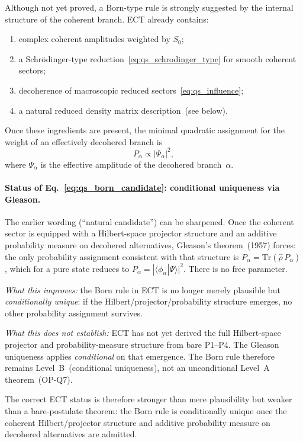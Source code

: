 \documentclass[11pt,a4paper]{article}
\numberwithin{equation}{section}
\begin{document}
Although not yet proved, a Born-type rule is strongly suggested by the
internal structure of the coherent branch.
ECT already contains:
\begin{enumerate}[label=(\roman*)]
  \item complex coherent amplitudes weighted by $S_0$;
  \item a Schr\"odinger-type reduction~\eqref{eq:qs_schrodinger_type}
    for smooth coherent sectors;
  \item decoherence of macroscopic reduced sectors~\eqref{eq:qs_influence};
  \item a natural reduced density matrix description~(see below).
\end{enumerate}
Once these ingredients are present, the minimal quadratic assignment
for the weight of an effectively decohered branch is
\begin{equation}
  \label{eq:qs_born_candidate}
  P_\alpha \propto |\Psi_\alpha|^2,
\end{equation}
where $\Psi_\alpha$ is the effective amplitude of the decohered
branch~$\alpha$.

\paragraph{Status of Eq.~\eqref{eq:qs_born_candidate}:
conditional uniqueness via Gleason.}
The earlier wording (``natural candidate'') can be sharpened.
Once the coherent sector is equipped with a Hilbert-space
projector structure and an additive probability measure on
decohered alternatives, Gleason's theorem~(1957) forces:
the only probability assignment consistent with that structure is
$P_\alpha=\mathrm{Tr}(\hat\rho\,P_\alpha)$, which for a pure
state reduces to $P_\alpha=|\langle\phi_\alpha|\Psi\rangle|^2$.
There is no free parameter.

\textit{What this improves:}
the Born rule in ECT is no longer merely plausible but
\emph{conditionally unique}: if the Hilbert/projector/probability
structure emerges, no other probability assignment survives.

\textit{What this does not establish:}
ECT has not yet derived the full Hilbert-space projector and
probability-measure structure from bare P1--P4.
The Gleason uniqueness applies \emph{conditional} on that emergence.
The Born rule therefore remains Level~B~(conditional uniqueness),
not an unconditional Level~A theorem~(OP-Q7).

The correct ECT status is therefore stronger than mere plausibility
but weaker than a bare-postulate theorem: the Born rule is
conditionally unique once the coherent Hilbert/projector structure
and additive probability measure on decohered alternatives are
admitted.
\end{document}
